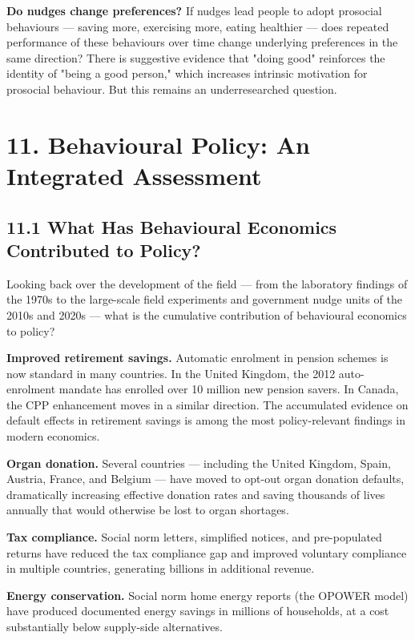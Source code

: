 \documentclass[12pt, letterpaper]{article}
\begin{document}
\textbf{Do nudges change preferences?} If nudges lead people to adopt prosocial behaviours --- saving more, exercising more, eating healthier --- does repeated performance of these behaviours over time change underlying preferences in the same direction? There is suggestive evidence that "doing good" reinforces the identity of "being a good person," which increases intrinsic motivation for prosocial behaviour. But this remains an underresearched question.

\medskip


\section{11. Behavioural Policy: An Integrated Assessment}



\subsection{11.1 What Has Behavioural Economics Contributed to Policy?}


Looking back over the development of the field --- from the laboratory findings of the 1970s to the large-scale field experiments and government nudge units of the 2010s and 2020s --- what is the cumulative contribution of behavioural economics to policy?

\textbf{Improved retirement savings.} Automatic enrolment in pension schemes is now standard in many countries. In the United Kingdom, the 2012 auto-enrolment mandate has enrolled over 10 million new pension savers. In Canada, the CPP enhancement moves in a similar direction. The accumulated evidence on default effects in retirement savings is among the most policy-relevant findings in modern economics.

\textbf{Organ donation.} Several countries --- including the United Kingdom, Spain, Austria, France, and Belgium --- have moved to opt-out organ donation defaults, dramatically increasing effective donation rates and saving thousands of lives annually that would otherwise be lost to organ shortages.

\textbf{Tax compliance.} Social norm letters, simplified notices, and pre-populated returns have reduced the tax compliance gap and improved voluntary compliance in multiple countries, generating billions in additional revenue.

\textbf{Energy conservation.} Social norm home energy reports (the OPOWER model) have produced documented energy savings in millions of households, at a cost substantially below supply-side alternatives.
\end{document}
